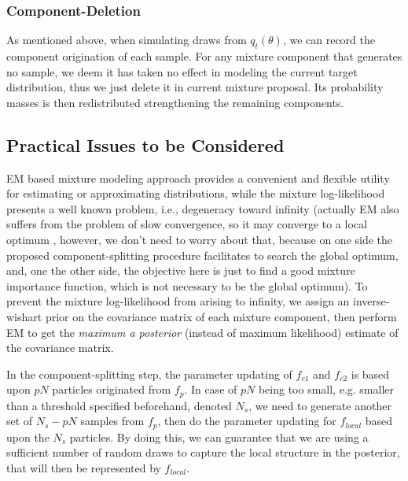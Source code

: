 \documentclass[aoas]{imsart}
\begin{document}
\subsubsection{Component-Deletion} \label{sec:deletion}
As mentioned above, when simulating draws from $q_t(\theta)$, we can
record the component origination of each sample. For any mixture
component that generates no sample, we deem it has taken no effect
in modeling the current target distribution, thus we just delete it
in current mixture proposal. Its probability masses is then
redistributed strengthening the remaining components.

\subsection{Practical Issues to be Considered}
EM based mixture modeling approach provides a convenient and
flexible utility for estimating or approximating distributions,
while the mixture log-likelihood presents a well known problem,
i.e., degeneracy toward infinity \citep{biernacki2003degeneracy}
(actually EM also suffers from the problem of slow convergence, so
it may converge to a local optimum \citep{biernacki2003degeneracy},
however, we don't need to worry about that, because on one side the
proposed component-splitting procedure facilitates to search the
global optimum, and, one the other side, the objective here is just
to find a good mixture importance function, which is not necessary
to be the global optimum). To prevent the mixture log-likelihood
from arising to infinity, we assign an inverse-wishart prior on the
covariance matrix of each mixture component, then perform EM to get
the \emph{maximum a posterior} (instead of maximum likelihood)
estimate of the covariance matrix.

In the component-splitting step, the parameter updating of $f_{c1}$
and $f_{c2}$ is based upon $pN$ particles originated from $f_p$. In
case of $pN$ being too small, e.g. smaller than a threshold
specified beforehand, denoted $N_s$, we need to generate another set
of $N_s-pN$ samples from $f_p$, then do the parameter updating for
$f_{local}$ based upon the $N_s$ particles. By doing this, we can
guarantee that we are using a sufficient number of random draws to
capture the local structure in the posterior, that will then be
represented by $f_{local}$.
\end{document}
